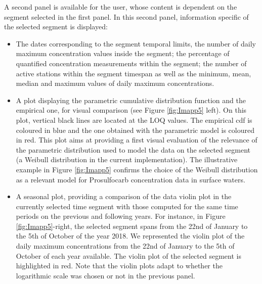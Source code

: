 A second panel is available for the user, whose content is dependent on the segment selected in the first panel. In this second panel, information specific of the selected segment is displayed:
\begin{itemize}
\item The dates corresponding to the segment temporal limits, the number of daily maximum concentration values inside the segment; the percentage of quantified concentration measurements within the segment; the number of active stations within the segment timespan as well as the minimum, mean, median and maximum values of daily maximum concentrations. 
\item A plot displaying the parametric cumulative distribution function and the empirical one, for visual comparison (see Figure \ref{fig:Imapp5} left). On this plot, vertical black lines are located at the LOQ values. The empirical cdf is coloured in blue and the one obtained with the parametric model is coloured in red. This plot aims at providing a first visual evaluation of the relevance of the parametric distribution used to model the data on the selected segment (a Weibull distribution in the current implementation).  The illustrative example in Figure \ref{fig:Imapp5} confirms the choice of the Weibull distribution as a relevant model for Prosulfocarb concentration data in surface waters.
\item A seasonal plot, providing a comparison of the data violin plot in the currently selected time segment with those computed for the same time periods on the previous and following years. For instance, in Figure \ref{fig:Imapp5}-right, the selected segment spans from the 22nd of January to the 5th of October of the year 2018. We represented the violin plot of the daily maximum concentrations from the 22nd of January to the 5th of October of each year available. The violin plot of the selected segment is highlighted in red. Note that the violin plots adapt to whether the logarithmic scale was chosen or not in the previous panel.
\end{itemize}  


